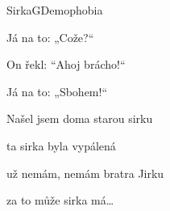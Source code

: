 \begin{song}{Sirka}{G}{Demophobia}
\begin{SBChorus*}
\begin{itshape}
Já na to: „Cože?“

On řekl: “Ahoj brácho!“

Já na to: „Sbohem!“
\end{itshape}
\end{SBChorus*}

\begin{SBChorus*}

Našel jsem doma starou sirku

ta sirka byla vypálená

už nemám, nemám bratra Jirku

za to může sirka má…

\end{SBChorus*}

\end{song}

\pagebreak